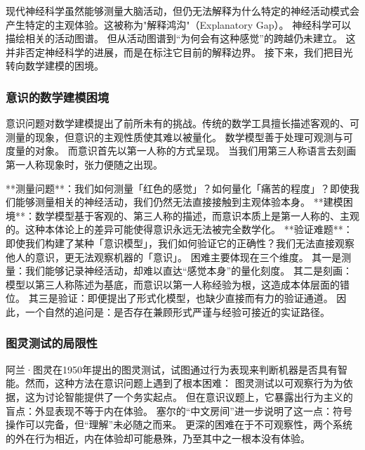 现代神经科学虽然能够测量大脑活动，但仍无法解释为什么特定的神经活动模式会产生特定的主观体验。这被称为"解释鸿沟"（Explanatory Gap）。
神经科学可以描绘相关的活动图谱。
但从活动图谱到“为何会有这种感觉”的跨越仍未建立。
这并非否定神经科学的进展，而是在标注它目前的解释边界。
接下来，我们把目光转向数学建模的困境。

\subsubsection{意识的数学建模困境}

意识问题对数学建模提出了前所未有的挑战。传统的数学工具擅长描述客观的、可测量的现象，但意识的主观性质使其难以被量化。
数学模型善于处理可观测与可度量的对象。
而意识首先以第一人称的方式呈现。
当我们用第三人称语言去刻画第一人称现象时，张力便随之出现。

**测量问题**：我们如何测量「红色的感觉」？如何量化「痛苦的程度」？即使我们能够测量相关的神经活动，我们仍然无法直接接触到主观体验本身。
**建模困境**：数学模型基于客观的、第三人称的描述，而意识本质上是第一人称的、主观的。这种本体论上的差异可能使得意识永远无法被完全数学化。
**验证难题**：即使我们构建了某种「意识模型」，我们如何验证它的正确性？我们无法直接观察他人的意识，更无法观察机器的「意识」。
困难主要体现在三个维度。
其一是测量：我们能够记录神经活动，却难以直达“感觉本身”的量化刻度。
其二是刻画：模型以第三人称陈述为基底，而意识以第一人称经验为根，这造成本体层面的错位。
其三是验证：即便提出了形式化模型，也缺少直接而有力的验证通道。
因此，一个自然的追问是：是否存在兼顾形式严谨与经验可接近的实证路径。

\subsubsection{图灵测试的局限性}

阿兰·图灵在1950年提出的图灵测试，试图通过行为表现来判断机器是否具有智能。然而，这种方法在意识问题上遇到了根本困难：
图灵测试以可观察行为为依据，这为讨论智能提供了一个务实起点。
但在意识议题上，它暴露出行为主义的盲点：外显表现不等于内在体验。
塞尔的“中文房间”进一步说明了这一点：符号操作可以完备，但“理解”未必随之而来。
更深的困难在于不可观察性，两个系统的外在行为相近，内在体验却可能悬殊，乃至其中之一根本没有体验。

